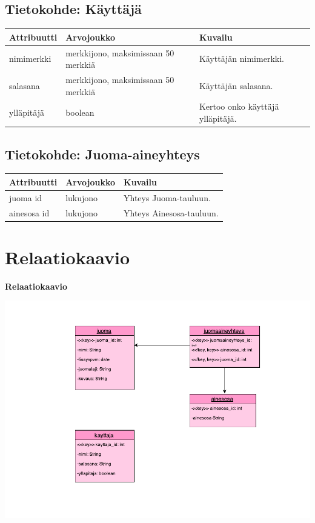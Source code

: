 \documentclass[a4paper]{article}
\begin{document}
\subsection{Tietokohde: Käyttäjä}
\begin{flushleft}
	\begin{tabular}{|l|l|l|}
			\hline
			Attribuutti & Arvojoukko & Kuvailu   \\ 
			\hline
			nimimerkki  & merkkijono, maksimissaan 50 merkkiä & Käyttäjän nimimerkki. \\ 
			\hline
			salasana    & merkkijono, maksimissaan 50 merkkiä & Käyttäjän salasana.   \\ 
			\hline
			ylläpitäjä    & boolean & Kertoo onko käyttäjä ylläpitäjä.   \\
			\hline
	\end{tabular}
\end{flushleft}

\subsection{Tietokohde: Juoma-aineyhteys}
\begin{flushleft}
	\begin{tabular}{|l|l|l|}
			\hline
			Attribuutti & Arvojoukko & Kuvailu   \\ 
			\hline
			juoma id  & lukujono & Yhteys Juoma-tauluun. \\ 
			\hline
			ainesosa id    & lukujono & Yhteys Ainesosa-tauluun.  \\ 
			\hline
	\end{tabular}
\end{flushleft}

\section{Relaatiokaavio}
\begin{flushleft}\textbf{Relaatiokaavio} \end{flushleft}

\includegraphics[scale=0.8]{relaatiokaavio.pdf}
\end{document}

